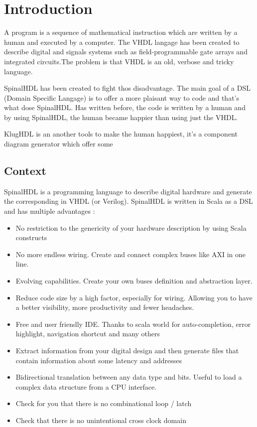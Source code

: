 \chapter{Introduction} %
\label{cha:Introduction}

A program is a sequence of mathematical instruction which are written by a human and executed by a computer.
The VHDL langage has been created to describe digital and signals systems such as field-programmable gate arrays
and integrated circuits\cite{wiki-vhdl}.The problem is that VHDL is an old, verbose and tricky language.

SpinalHDL has been created to fight thos disadvantage. The main goal of a DSL (Domain Specific Langage) is to offer a more plaisant way to code and that's what dose SpinalHDL. Has written before, the code is written by a human and by using SpinalHDL, the human became happier than using just the VHDL.

KlugHDL is an another tools to make the human happiest, it's a component diagram generator which offer some

\section{Context} %
\label{sec:Context}

SpinalHDL is a programming language to describe digital hardware and generate the corresponding in VHDL (or Verilog). SpinalHDL is written in Scala as a DSL and has multiple advantages\cite{github-spinalhdl} :
\begin{itemize}
    \item No restriction to the genericity of your hardware description by using Scala constructs
    \item No more endless wiring. Create and connect complex buses like AXI in one line.
    \item Evolving capabilities. Create your own buses definition and abstraction layer.
    \item Reduce code size by a high factor, especially for wiring. Allowing you to have a better visibility, more productivity and fewer headaches.
    \item Free and user friendly IDE. Thanks to scala world for auto-completion, error highlight, navigation shortcut and many others
    \item Extract information from your digital design and then generate files that contain information about some latency and addresses
    \item Bidirectional translation between any data type and bits. Useful to load a complex data structure from a CPU interface.
    \item Check for you that there is no combinational loop / latch
    \item Check that there is no unintentional cross clock domain
\end{itemize}

